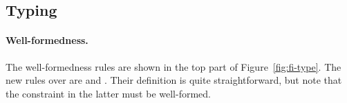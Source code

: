 %
%
\subsection{Typing}

\begin{comment}
\begin{figure}[!t]
  \begin{mathpar}
    \formwf \\ \rulewfint \and \rulewfvardis \and \rulewffun \and \rulewfrec \and 
    \rulewftop \and \rulewfforalldis \and \rulewfinterdis 
  \end{mathpar}

  \caption{Well-formedness rules for types of \name.}
  \label{fig:wf}
\end{figure}
\end{comment}



\paragraph{Well-formedness.}
The well-formedness rules are shown in the top part of Figure~\ref{fig:fi-type}. 
The new rules over \oldname are  and . 
Their definition is quite straightforward, but note that the constraint in the latter
must be well-formed.

